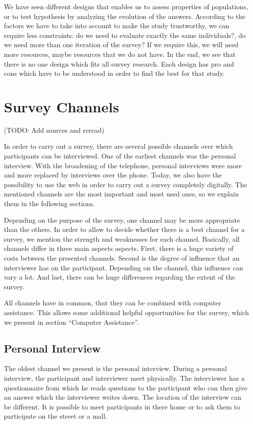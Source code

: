 \documentclass{report}
\begin{document}
We have seen different designs that enables us to assess properties of populations, or to test hypothesis by analyzing the evolution of the answers. According to the factors we have to take into account to make the study trustworthy, we can require less constraints: do we need to evaluate exactly the same individuals?, do we need more than one iteration of the survey? If we require this, we will need more resources, maybe resources that we do not have. In the end, we see that there is no one design which fits all survey research. Each design has pro and cons which have to be understood in order to find the best for that study.

\chapter{Survey Channels}
(TODO: Add sources and reread)

In order to carry out a survey, there are several possible channels over which participants can be interviewed. One of the earliest channels was the personal interview. With the broadening of the telephone, personal interviews were more and more replaced by interviews over the phone. Today, we also have the possibility to use the web in order to carry out a survey completely digitally. The mentioned channels are the most important and most used ones, so we explain them in the following sections.

Depending on the purpose of the survey, one channel may be more appropriate than the others. In order to allow to decide whether there is a best channel for a survey, we mention the strength and weaknesses for each channel. Basically, all channels differ in three main aspects aspects. First, there is a huge variety of costs between the presented channels. Second is the degree of influence that an interviewer has on the participant. Depending on the channel, this influence can vary a lot. And last, there can be huge differences regarding the extent of the survey.

All channels have in common, that they can be combined with computer assistance. This allows some additional helpful opportunities for the survey, which we present in section “Computer Assistance”.


\section{Personal Interview}

The oldest channel we present is the personal interview. During a personal interview, the participant and interviewer meet physically. The interviewer has a questionnaire from which he reads questions to the participant who can then give an answer which the interviewer writes down. The location of the interview can be different. It is possible to meet participants in there home or to ask them to participate on the street or a mall.
\end{document}
